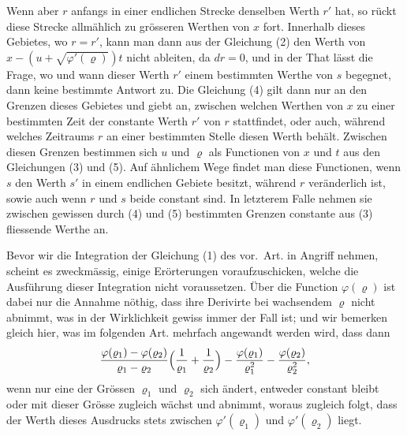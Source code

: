 \documentclass[12pt,a4paper]{book}
\theoremstyle{definition}
\theoremstyle{remark}
\begin{document}
Wenn aber $r$ anfangs in einer endlichen Strecke denselben Werth $r'$ hat, so r\"uckt diese Strecke allm\"ahlich zu gr\"osseren Werthen von $x$ fort. Innerhalb dieses Gebietes, wo $r = r'$, kann man dann aus der Gleichung (2) den Werth von $x - (u + \sqrt{\varphi'(\varrho)})t$ nicht ableiten, da $dr = 0$, und in der That l\"asst die Frage, wo und wann dieser Werth $r'$ einem bestimmten Werthe von $s$ begegnet, dann keine bestimmte Antwort zu. Die Gleichung (4) gilt dann nur an den Grenzen dieses Gebietes und giebt an, zwischen welchen Werthen von $x$ zu einer bestimmten Zeit der constante Werth $r'$ von $r$ stattfindet, oder auch, w\"ahrend welches Zeitraums $r$ an einer bestimmten Stelle diesen Werth beh\"alt. Zwischen diesen Grenzen bestimmen sich $u$ und $\varrho$ als Functionen von $x$ und $t$ aus den Gleichungen (3) und (5). Auf \"ahnlichem Wege findet man diese Functionen, wenn $s$ den Werth $s'$ in einem endlichen Gebiete besitzt, w\"ahrend $r$ ver\"anderlich ist, sowie auch wenn $r$ und $s$ beide constant sind. In letzterem Falle nehmen sie zwischen gewissen durch (4) und (5) bestimmten Grenzen constante aus (3) fliessende Werthe an.

Bevor wir die Integration der Gleichung (1) des vor.~Art. in Angriff nehmen, scheint es zweckm\"assig, einige Er\"orterungen voraufzuschicken, welche die Ausf\"uhrung dieser Integration nicht voraussetzen. \"Uber die Function $\varphi(\varrho)$ ist dabei nur die Annahme n\"othig, dass ihre Derivirte bei wachsendem $\varrho$ nicht abnimmt, was in der Wirklichkeit gewiss immer der Fall ist; und wir bemerken gleich hier, was im folgenden Art. mehrfach angewandt werden wird, dass dann
\[
\frac{\varphi(\varrho_{1}) - \varphi(\varrho_{2})}{\varrho_{1} - \varrho_{2}}\Bigl(\frac{1}{\varrho_{1}} + \frac{1}{\varrho_{2}}\Bigr) - \frac{\varphi(\varrho_{1})}{\varrho_{1}^{2}} - \frac{\varphi(\varrho_{2})}{\varrho_{2}^{2}},
\]
 wenn nur eine der Gr\"ossen $\varrho_{1}$ und $\varrho_{2}$ sich \"andert, entweder constant bleibt oder mit dieser Gr\"osse zugleich w\"achst und abnimmt, woraus zugleich folgt, dass der Werth dieses Ausdrucks stets zwischen $\varphi'(\varrho_{1})$ und $\varphi'(\varrho_{2})$ liegt.
\end{document}
